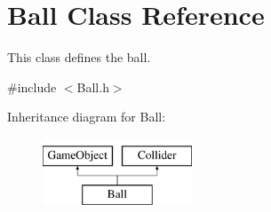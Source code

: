 \hypertarget{class_ball}{}\section{Ball Class Reference}
\label{class_ball}


This class defines the ball.  




{\ttfamily \#include $<$Ball.\+h$>$}

Inheritance diagram for Ball\+:\begin{figure}[H]
\begin{center}
\leavevmode
\includegraphics[height=2.000000cm]{class_ball}
\end{center}
\end{figure}
